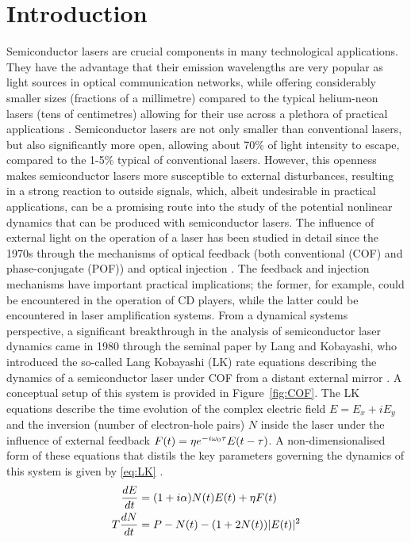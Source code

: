 \section{Introduction}
\label{sec:introduction}
%
Semiconductor lasers are crucial components in many technological applications. 
They have the advantage that their emission wavelengths are very popular as light sources in optical communication networks, 
while offering considerably smaller sizes (fractions of a millimetre) compared to the typical helium-neon lasers (tens of centimetres) allowing for their use across a plethora of practical applications \cite{vantartwijk1995semiconductor}. 
Semiconductor lasers are not only smaller than conventional lasers, but also significantly more open, allowing about 70\% of light intensity to escape, compared to the 1-5\% typical of conventional lasers. 
However, this openness makes semiconductor lasers more susceptible to external disturbances, resulting in a strong reaction to outside signals, 
which, albeit undesirable in practical applications, can be a promising route into the study of the potential nonlinear dynamics that can be produced with semiconductor lasers.
The influence of external light on the operation of a laser has been studied in detail since the 1970s through the mechanisms of optical feedback (both conventional (COF) and phase-conjugate (POF)) and optical injection \cite{weiss1991dynamics}. 
The feedback and injection mechanisms have important practical implications; the former, for example, could be encountered in the operation of CD players, while the latter could be encountered in laser amplification systems. 
From a dynamical systems perspective, a significant breakthrough in the analysis of semiconductor laser dynamics came in 1980 through the seminal paper by Lang and Kobayashi, 
who introduced the so-called Lang Kobayashi (LK) rate equations describing the dynamics of a semiconductor laser under COF from a distant external mirror \cite{lang1980external}. 
A conceptual setup of this system is provided in Figure~\ref{fig:COF}. 
The LK equations describe the time evolution of the complex electric field $E = E_x + i E_y$ and the inversion (number of electron-hole pairs) $N$ inside the laser under the influence of external feedback $F(t) = \eta e^{-i\omega_0\tau} E(t-\tau)$. 
A non-dimensionalised form of these equations that distils the key parameters governing the dynamics of this system is given by \eqref{eq:LK} \cite{heil2003delay}.
%
\begin{equation}
\label{eq:LK}
    \begin{aligned}
        \frac{d E}{d t} & =(1+i \alpha) N(t) E(t)+\eta F(t) \\
        T \frac{d N}{d t} & =P-N(t)-(1+2 N(t))|E(t)|^2
    \end{aligned}
\end{equation}
